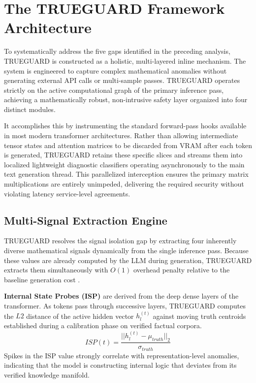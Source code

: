 \documentclass{article}
\begin{document}
\section{The TRUEGUARD Framework Architecture}
\label{sec:trueguard}

To systematically address the five gaps identified in the preceding analysis, TRUEGUARD is constructed as a holistic, multi-layered inline mechanism. The system is engineered to capture complex mathematical anomalies without generating external API calls or multi-sample passes. TRUEGUARD operates strictly on the active computational graph of the primary inference pass, achieving a mathematically robust, non-intrusive safety layer organized into four distinct modules.

It accomplishes this by instrumenting the standard forward-pass hooks available in most modern transformer architectures. Rather than allowing intermediate tensor states and attention matrices to be discarded from VRAM after each token is generated, TRUEGUARD retains these specific slices and streams them into localized lightweight diagnostic classifiers operating asynchronously to the main text generation thread. This parallelized interception ensures the primary matrix multiplications are entirely unimpeded, delivering the required security without violating latency service-level agreements.

\subsection{Multi-Signal Extraction Engine}

TRUEGUARD resolves the signal isolation gap by extracting four inherently diverse mathematical signals dynamically from the single inference pass. Because these values are already computed by the LLM during generation, TRUEGUARD extracts them simultaneously with $O(1)$ overhead penalty relative to the baseline generation cost \cite{su2024mind,kossen2024sep}.

\textbf{Internal State Probes (ISP)} are derived from the deep dense layers of the transformer. As tokens pass through successive layers, TRUEGUARD computes the $L2$ distance of the active hidden vector $h_{l}^{(t)}$ against moving truth centroids established during a calibration phase on verified factual corpora.
    \begin{equation}
        ISP(t) = \frac{||h_{l}^{(t)} - \mu_{truth}||_{2}}{\sigma_{truth}}
    \end{equation}
    Spikes in the ISP value strongly correlate with representation-level anomalies, indicating that the model is constructing internal logic that deviates from its verified knowledge manifold.
\end{document}
